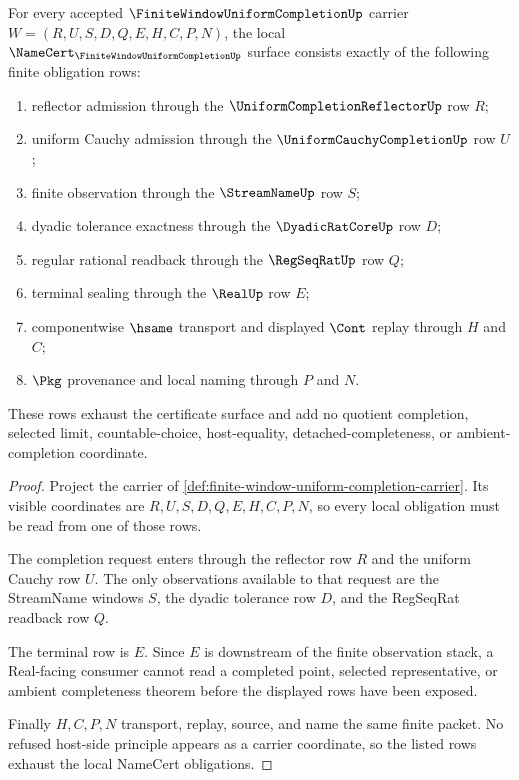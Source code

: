 \begin{theorem}
\label{thm:finite-window-uniform-completion-namecert-obligations}
For every accepted $\FiniteWindowUniformCompletionUp$ carrier $W=(R,U,S,D,Q,E,H,C,P,N)$, the local $\NameCert_{\FiniteWindowUniformCompletionUp}$ surface consists exactly of the following finite obligation rows:
\begin{enumerate}
\item reflector admission through the $\UniformCompletionReflectorUp$ row $R$;
\item uniform Cauchy admission through the $\UniformCauchyCompletionUp$ row $U$;
\item finite observation through the $\StreamNameUp$ row $S$;
\item dyadic tolerance exactness through the $\DyadicRatCoreUp$ row $D$;
\item regular rational readback through the $\RegSeqRatUp$ row $Q$;
\item terminal sealing through the $\RealUp$ row $E$;
\item componentwise $\hsame$ transport and displayed $\Cont$ replay through $H$ and $C$;
\item $\Pkg$ provenance and local naming through $P$ and $N$.
\end{enumerate}
These rows exhaust the certificate surface and add no quotient completion, selected limit, countable-choice, host-equality, detached-completeness, or ambient-completion coordinate.
\end{theorem}
\begin{proof}
Project the carrier of \autoref{def:finite-window-uniform-completion-carrier}. Its visible coordinates are $R,U,S,D,Q,E,H,C,P,N$, so every local obligation must be read from one of those rows.

The completion request enters through the reflector row $R$ and the uniform Cauchy row $U$. The only observations available to that request are the StreamName windows $S$, the dyadic tolerance row $D$, and the RegSeqRat readback row $Q$.

The terminal row is $E$. Since $E$ is downstream of the finite observation stack, a Real-facing consumer cannot read a completed point, selected representative, or ambient completeness theorem before the displayed rows have been exposed.

Finally $H,C,P,N$ transport, replay, source, and name the same finite packet. No refused host-side principle appears as a carrier coordinate, so the listed rows exhaust the local NameCert obligations.
\end{proof}


